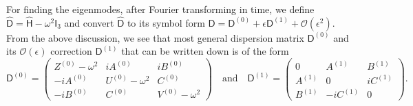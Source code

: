 \begin{subappendices}
For finding the eigenmodes, after Fourier transforming in time, we define $\widehat{\mathsf{D}} = \widehat{\mathsf{H}} - \omega^{2}\mathsf{I}_{3}$ and convert $\widehat{\mathsf{D}}$ to its symbol form $\mathsf{D} = \mathsf{D}^{(0)} + \epsilon\mathsf{D}^{(1)} + \mathcal{O}(\epsilon^{2})$.
From the above discussion, we see that most general dispersion matrix $\mathsf{D}^{(0)}$ and its $\mathcal{O}(\epsilon)$ correction $\mathsf{D}^{(1)}$ that can be written down is of the form
%
\begin{equation}
\mathsf{D}^{(0)} =
\begin{pmatrix}
  Z^{(0)} - \omega^{2} & i{A}^{(0)} & i{B}^{(0)}\\
  -i{A}^{(0)} & U^{(0)} - \omega^{2} & {C}^{(0)}\\
  -i{B}^{(0)} & C^{(0)} & V^{(0)} - \omega^{2}
\end{pmatrix}
\quad\text{and}\quad
\mathsf{D}^{(1)} =
\begin{pmatrix}
  0 & {A}^{(1)} & {B}^{(1)}\\
  A^{(1)} & 0 & iC^{(1)} \\
  B^{(1)} & -iC^{(1)} & 0
\end{pmatrix}.
\label{eq:gen_disp_matrix}
\end{equation}


\end{subappendices}
